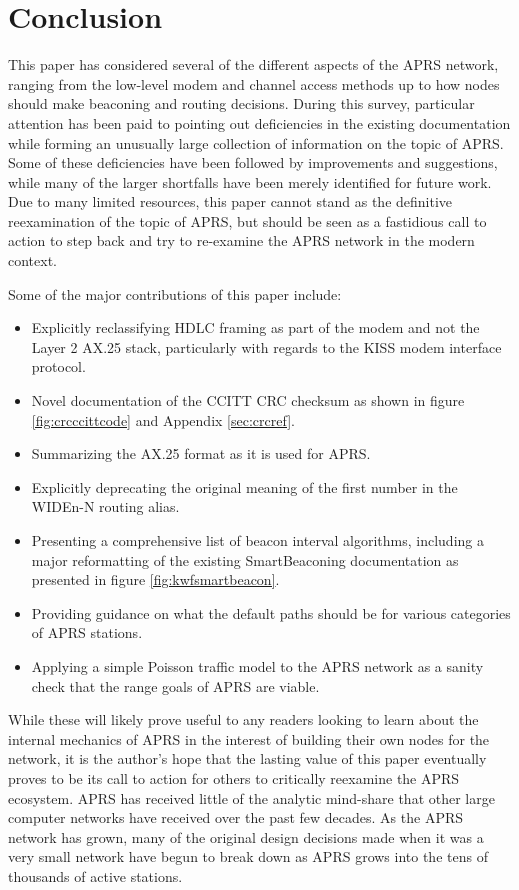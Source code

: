 \chapter{Conclusion}

This paper has considered several of the different aspects of the APRS network,
ranging from the low-level modem and channel access methods up to
how nodes should make beaconing and routing decisions.
During this survey, particular attention has been paid to pointing out
deficiencies in the existing documentation while forming 
an unusually large collection of information on the topic of APRS.
Some of these deficiencies have been followed by improvements
and suggestions, while many of the larger shortfalls have
been merely identified for future work.
Due to many limited resources, this paper cannot stand as the definitive
reexamination of the topic of APRS,
but should be seen as a fastidious call to action to step back and
try to re-examine the APRS network in the modern context.

Some of the major contributions of this paper include:
\begin{itemize}
	\item Explicitly reclassifying HDLC framing as part of the modem
		and not the Layer 2 AX.25 stack, particularly with
		regards to the KISS modem interface protocol.
	\item Novel documentation of the CCITT CRC checksum as shown in
		figure \ref{fig:crcccittcode} and Appendix \ref{sec:crcref}.
	\item Summarizing the AX.25 format as it is used for APRS.
	\item Explicitly deprecating the original meaning of the first number
		in the WIDEn-N routing alias.
	\item Presenting a comprehensive list of beacon interval
		algorithms, including a major reformatting of the
		existing SmartBeaconing documentation as presented
		in figure \ref{fig:kwfsmartbeacon}.
	\item Providing guidance on what the default paths should be for
		various categories of APRS stations.
	\item Applying a simple Poisson traffic model to the APRS network
		as a sanity check that the range goals of APRS are viable.
\end{itemize}

While these will likely prove useful to any readers looking to learn about
the internal mechanics of APRS in the interest of building their own nodes
for the network, it is the author's hope that the lasting value of this paper
eventually proves to be its call to action for others to critically 
reexamine the APRS ecosystem.
APRS has received little of the analytic mind-share that other large
computer networks have received over the past few decades.
As the APRS network has grown, many
of the original design decisions made when it was a very small network
have begun to break down as APRS grows into the tens of thousands of active stations.

